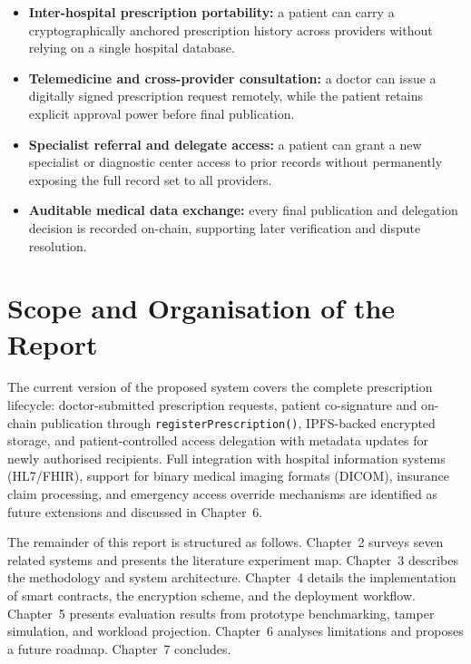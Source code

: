\documentclass[12pt,a4wide]{report}
\begin{document}
\begin{itemize}
  \item \textbf{Inter-hospital prescription portability:} a patient can carry
    a cryptographically anchored prescription history across providers without
    relying on a single hospital database.
  \item \textbf{Telemedicine and cross-provider consultation:} a doctor can
    issue a digitally signed prescription request remotely, while the patient
    retains explicit approval power before final publication.
  \item \textbf{Specialist referral and delegate access:} a patient can grant
    a new specialist or diagnostic center access to prior records without
    permanently exposing the full record set to all providers.
  \item \textbf{Auditable medical data exchange:} every final publication and
    delegation decision is recorded on-chain, supporting later verification and
    dispute resolution.
\end{itemize}

\section{Scope and Organisation of the Report}

The current version of the proposed system covers the complete prescription lifecycle:
doctor-submitted prescription requests, patient co-signature and on-chain
publication through \texttt{registerPrescription()}, IPFS-backed encrypted
storage, and patient-controlled access delegation with metadata updates for
newly authorised recipients. Full integration with hospital information systems
(HL7/FHIR), support for binary medical imaging formats (DICOM), insurance claim
processing, and emergency access override mechanisms are identified as future
extensions and discussed in Chapter~6.

The remainder of this report is structured as follows. Chapter~2 surveys seven
related systems and presents the literature experiment map. Chapter~3 describes
the methodology and system architecture. Chapter~4 details the implementation of
smart contracts, the encryption scheme, and the deployment workflow. Chapter~5
presents evaluation results from prototype benchmarking, tamper simulation, and
workload projection. Chapter~6 analyses limitations and proposes a future roadmap.
Chapter~7 concludes.

\end{document}

